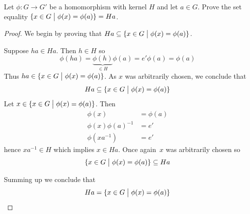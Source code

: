 \begin{prob}[52 Fraleigh's p.135]
    Let $\phi : G \to G'$ be a homomorphism with kernel $H$ and 
    let $a \in G$. Prove the set equality $\{x \in G \bigm| 
    \phi(x) = \phi(a)\} = Ha$.
\end{prob}
\begin{proof}
    We begin by proving that $Ha \subseteq \{x \in G \bigm| 
    \phi(x) = \phi(a)\}$.

    Suppose $ha \in Ha$. 
    Then $h \in H$ so 
    \[
    \phi(ha) = \underbrace{\phi(h)}_{\in H} \phi(a) 
        = e' \phi(a) = \phi(a)
    \]
    Thus $ha \in \{x \in G \bigm| \phi(x) = \phi(a)\}$. As $x$ 
    was arbitrarily chosen, we conclude that 
    \[ 
        Ha\subseteq \{x \in G \bigm| \phi(x) 
        = \phi(a)\}
    \]
    Let $x \in \{x \in G \bigm| \phi(x) = \phi(a)\}$. 
    Then 
    \begin{align*}
        \phi(x) &= \phi(a) \\ 
        \phi(x) \phi(a)^{-1} &= e' \\ 
        \phi(x a^{-1}) &= e'
    \end{align*}
    hence $xa^{-1} \in H$ which implies $x \in Ha$.
    Once again $x$ was arbitrarily chosen so 
    \[
        \{x \in G \bigm| \phi(x) = \phi(a)\} \subseteq Ha
    \]
    
    Summing up we conclude that 
    \[
        Ha = \{x \in G \bigm| \phi(x) = \phi(a)\}
    \]
\end{proof}

\newpage
